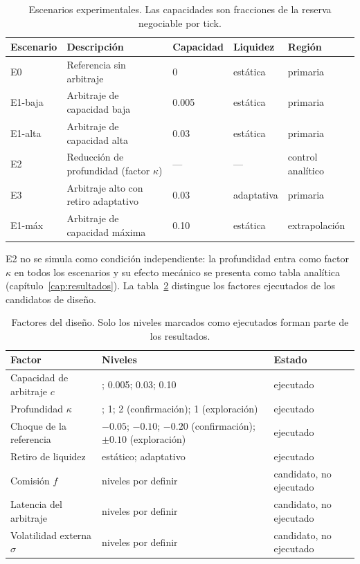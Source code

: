 \begin{table}[htbp]
\centering
\caption{Escenarios experimentales. Las capacidades son fracciones de la reserva negociable por tick.}
\label{tab:escenarios}
\small
\begin{tabularx}{\textwidth}{@{}l >{\raggedright\arraybackslash}X l l l@{}}
\toprule
Escenario & Descripción & Capacidad & Liquidez & Región \\
\midrule
E0 & Referencia sin arbitraje & 0 & estática & primaria \\
E1-baja & Arbitraje de capacidad baja & 0.005 & estática & primaria \\
E1-alta & Arbitraje de capacidad alta & 0.03 & estática & primaria \\
E2 & Reducción de profundidad (factor $\kappa$) & --- & --- & control analítico \\
E3 & Arbitraje alto con retiro adaptativo & 0.03 & adaptativa & primaria \\
E1-máx & Arbitraje de capacidad máxima & 0.10 & estática & extrapolación \\
\bottomrule
\end{tabularx}
\end{table}

E2 no se simula como condición independiente: la profundidad entra como factor $\kappa$ en todos los escenarios y su efecto mecánico se presenta como tabla analítica (capítulo~\ref{cap:resultados}). La tabla~\ref{tab:factores} distingue los factores ejecutados de los candidatos de diseño.

\begin{table}[htbp]
\centering
\caption{Factores del diseño. Solo los niveles marcados como ejecutados forman parte de los resultados.}
\label{tab:factores}
\small
\begin{tabularx}{\textwidth}{@{}l >{\raggedright\arraybackslash}X l@{}}
\toprule
Factor & Niveles & Estado \\
\midrule
Capacidad de arbitraje $c$ & 0; 0.005; 0.03; 0.10 & ejecutado \\
Profundidad $\kappa$ & 0.5; 1; 2 (confirmación); 1 (exploración) & ejecutado \\
Choque de la referencia & $-0.05$; $-0.10$; $-0.20$ (confirmación); $\pm0.10$ (exploración) & ejecutado \\
Retiro de liquidez & estático; adaptativo & ejecutado \\
Comisión $f$ & niveles por definir & candidato, no ejecutado \\
Latencia del arbitraje & niveles por definir & candidato, no ejecutado \\
Volatilidad externa $\sigma$ & niveles por definir & candidato, no ejecutado \\
\bottomrule
\end{tabularx}
\end{table}

